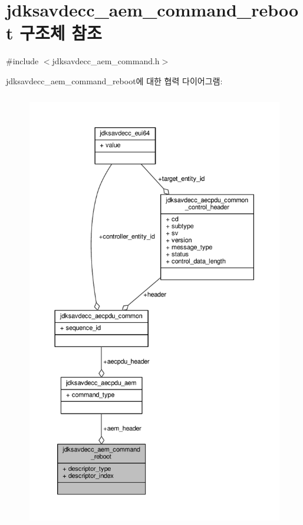\hypertarget{structjdksavdecc__aem__command__reboot}{}\section{jdksavdecc\+\_\+aem\+\_\+command\+\_\+reboot 구조체 참조}
\label{structjdksavdecc__aem__command__reboot}


{\ttfamily \#include $<$jdksavdecc\+\_\+aem\+\_\+command.\+h$>$}



jdksavdecc\+\_\+aem\+\_\+command\+\_\+reboot에 대한 협력 다이어그램\+:
\nopagebreak
\begin{figure}[H]
\begin{center}
\leavevmode
\includegraphics[height=550pt]{structjdksavdecc__aem__command__reboot__coll__graph}
\end{center}
\end{figure}
